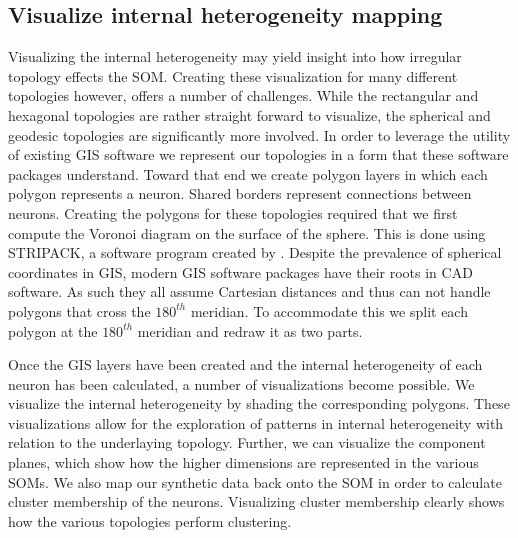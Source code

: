 \subsection{Visualize internal heterogeneity mapping}
Visualizing the internal heterogeneity may yield insight into how irregular topology
effects the SOM.  Creating these visualization for many different topologies
however, offers a number of challenges.  While the rectangular and hexagonal
topologies are rather straight forward to visualize, the spherical and geodesic
topologies are significantly more involved.  In order to leverage the utility
of existing GIS software we represent our topologies in a form that
these software packages understand.  Toward that end we create polygon layers
in which each polygon represents a neuron.  Shared borders represent
connections between neurons.  Creating the polygons for these topologies
required that we first compute the Voronoi diagram on the surface of the
sphere.  This is done using STRIPACK, a software program created by
\cite{Ranka97}.  Despite the prevalence of spherical coordinates
in GIS, modern GIS software packages have their roots in CAD software. As such
they all assume Cartesian distances and thus can not handle polygons that
cross the $180^{th}$ meridian.  To accommodate this we split each polygon at
the $180^{th}$ meridian and redraw it as two parts.

Once the GIS layers have been created and the internal heterogeneity of each
neuron has been calculated, a number of visualizations become possible. We
visualize the internal heterogeneity by shading the corresponding polygons.
These visualizations allow for the exploration of patterns in internal
heterogeneity with relation to the underlaying topology.  Further, we can
visualize the component planes, which show how the higher dimensions are
represented in the various SOMs.  We also map our synthetic data back onto the SOM in
order to calculate cluster membership of the neurons.  Visualizing cluster
membership clearly shows how the various topologies perform clustering.


